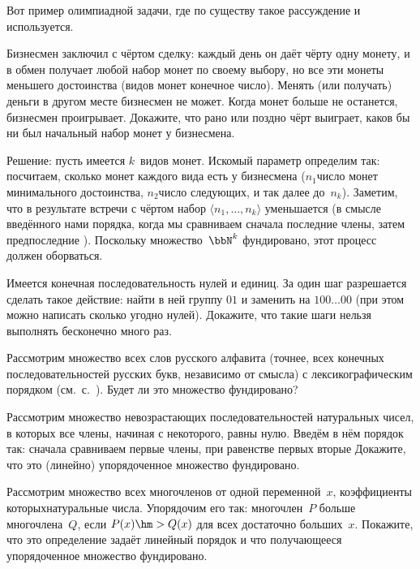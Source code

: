 Вот пример олимпиадной задачи, где по существу такое рассуждение
и используется.

Бизнесмен заключил с чёртом сделку: каждый день он даёт
чёрту одну монету, и в обмен получает любой набор монет по
своему выбору, но все эти монеты меньшего достоинства (видов
монет конечное число). Менять (или получать) деньги в другом
месте бизнесмен не может. Когда монет больше не останется,
бизнесмен проигрывает.
Докажите, что рано или поздно чёрт выиграет, каков бы ни был
начальный набор монет у бизнесмена.

Решение: пусть имеется $k$~видов монет. Искомый параметр
определим так: посчитаем, сколько монет каждого вида есть у
бизнесмена ($n_1$\т число монет минимального достоинства,
$n_2$\т число следующих, и так далее до~$n_k$). Заметим, что в
результате встречи с чёртом набор $\langle n_1,\dots,n_k\rangle$
уменьшается (в смысле введённого нами порядка, когда мы
сравниваем сначала последние члены, затем предпоследние ).
Поскольку множество~$\bbN^k$ фундировано, этот процесс должен
оборваться.

\problskip
\begin{problem}
Имеется конечная последовательность нулей и единиц. За один
шаг разрешается сделать такое действие: найти в ней группу $01$
и заменить на $100{\dots}00$ (при этом можно написать сколько
угодно нулей). Докажите, что такие шаги нельзя выполнять бесконечно
много раз.
\end{problem}

\begin{problem}
Рассмотрим множество всех слов русского алфавита (точнее, всех
конечных последовательностей русских букв, независимо от смысла)
с лексикографическим порядком
(см.~с.~\pageref{lexicographic-ordering}). Будет ли это множество
фундировано?
\end{problem}

\begin{problem}
Рассмотрим множество невозрастающих последовательностей
натуральных чисел, в которых
все члены, начиная с некоторого, равны нулю. Введём
в нём порядок так: сначала сравниваем первые члены,
при равенстве первых вторые  Докажите, что
это (линейно) упорядоченное множество фундировано.
\end{problem}

\begin{problem}
Рассмотрим множество всех многочленов от одной переменной~$x$,
коэффициенты которых\т натуральные числа. Упорядочим его так:
многочлен~$P$ больше многочлена~$Q$, если $P(x)\hm>Q(x)$ для
всех достаточно больших~$x$. Покажите, что это определение
задаёт линейный порядок и что получающееся упорядоченное
множество фундировано.
\end{problem}
